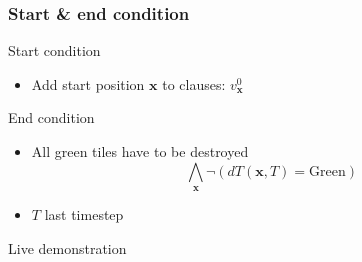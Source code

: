 \begin{frame}
	\frametitle{Start \& end condition}
	\begin{block}{Start condition}
		\begin{itemize}
			\item Add start position $\pmb x$ to clauses: $v_{\pmb x}^{0}$
		\end{itemize}
	\end{block}

	\begin{block}{End condition}
		\begin{itemize}
			\item All green tiles have to be destroyed
			\begin{displaymath}
				\bigwedge_{\pmb x} \neg (dT(\pmb x, T) = \text{Green})
			\end{displaymath}
			\item $T$ last timestep
		\end{itemize}
	\end{block}
\end{frame}

\begin{frame}
	\centering
	\hfill \Large Live demonstration \hfill\hfill
\end{frame}
